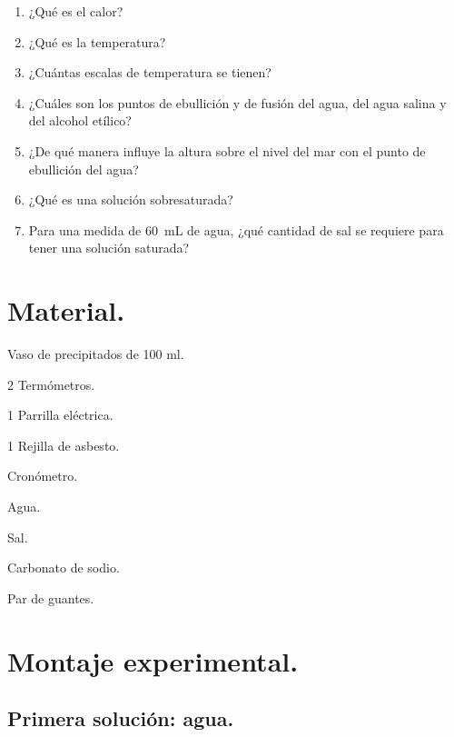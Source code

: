 \documentclass[14pt]{extarticle}
\begin{document}
\begin{enumerate}[label=\alph*)]
\item ¿Qué es el calor?
\item ¿Qué es la temperatura?
\item ¿Cuántas escalas de temperatura se tienen?
\item ¿Cuáles son los puntos de ebullición y de fusión del agua, del agua salina y del alcohol etílico?
\item ¿De qué manera influye la altura sobre el nivel del mar con el punto de ebullición del agua?
\item ¿Qué es una solución sobresaturada?
\item Para una medida de \SI{60}{\milli\liter} de agua, ¿qué cantidad de sal se requiere para tener una solución saturada?
\end{enumerate}

\section{Material.}

\begin{enumerate}[label=\roman*)]
\begin{minipage}[t]{8cm}
\item Vaso de precipitados de 100 ml.
\item 2 Termómetros.
\item 1 Parrilla eléctrica.
\item 1 Rejilla de asbesto.
\item Cronómetro.
\end{minipage}
\hspace{0.75cm}
\begin{minipage}[t]{4.5cm}
\item Agua.
\item Sal.
\item Carbonato de sodio.
\item Par de guantes.
\end{minipage}
\end{enumerate}


\section{Montaje experimental.}

\subsection{Primera solución: agua.}
\end{document}

